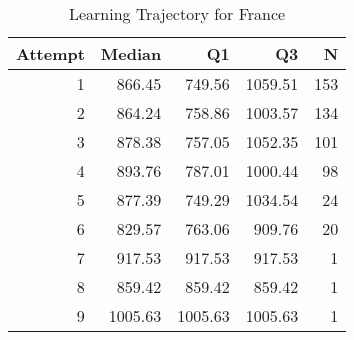 \begin{table}[htbp]
\centering
\caption{Learning Trajectory for France}
\label{tab:learning-trajectory}
\begin{tabular}{rrrrr}
\toprule
Attempt & Median & Q1 & Q3 & N \\
\midrule
1 & 866.45 & 749.56 & 1059.51 & 153 \\
2 & 864.24 & 758.86 & 1003.57 & 134 \\
3 & 878.38 & 757.05 & 1052.35 & 101 \\
4 & 893.76 & 787.01 & 1000.44 & 98 \\
5 & 877.39 & 749.29 & 1034.54 & 24 \\
6 & 829.57 & 763.06 & 909.76 & 20 \\
7 & 917.53 & 917.53 & 917.53 & 1 \\
8 & 859.42 & 859.42 & 859.42 & 1 \\
9 & 1005.63 & 1005.63 & 1005.63 & 1 \\
\bottomrule
\end{tabular}
\end{table}